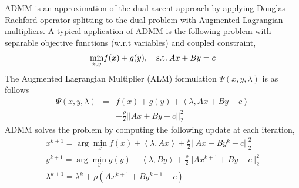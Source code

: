 \documentclass{article}
\newcounter{thm_counter}
\newcounter{lem_counter}
\newcounter{pro_counter}
\newcounter{ass_counter}
\begin{document}
ADMM is an approximation of the dual ascent approach by applying Douglas-Rachford
operator splitting to the dual problem with Augmented Lagrangian
multipliers. 
A typical application of ADMM is the following problem with separable
objective functions (w.r.t variables) and coupled constraint, 
%
\begin{equation}
{\min_{x,y}}f(x)+g(y),\quad{\rm {s.t.}}\:Ax+By=c
\end{equation}
%
The Augmented Lagrangian  Multiplier (ALM) formulation $\Psi(x,y,\lambda)$ is as
follows
% 
\begin{eqnarray}
\nonumber
\Psi (x,y,\lambda ) &=& f(x) + g(y) +  \left\langle {\lambda ,Ax + By - c} \right\rangle \\
& & + \frac{\rho }{2}||Ax + By - c||_2^2
\end{eqnarray}
%
ADMM solves the problem by computing the following update at each iteration, 
\begin{equation}
\begin{array}{l}
{x^{k + 1}} = \arg \mathop {\min }\limits_x f(x) +  \left\langle {\lambda ,Ax} \right\rangle  + \frac{\rho }{2}||Ax + B{y^k} - c||_2^2\\
{y^{k + 1}} = \arg \mathop {\min }\limits_y g(y) +  \left\langle {\lambda ,By} \right\rangle  + \frac{\rho }{2}||A{x^{k+1}} + By - c||_2^2\\
{\lambda ^{k + 1}} = {\lambda ^k} + \rho (A{x^{k + 1}} + B{y^{k + 1}} - c)
\end{array}
\end{equation}
\end{document}

